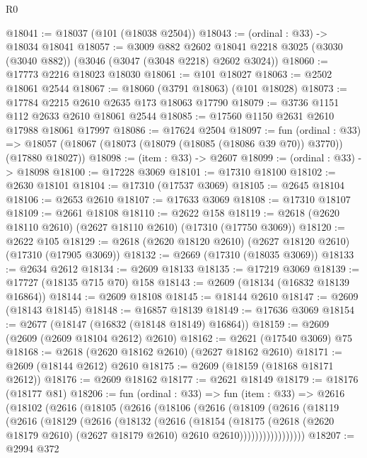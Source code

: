 \begin{lexlean}{R0}
\begin{coremodule}
@18041 := @18037 (@101 (@18038 @2504))
@18043 := (ordinal : @33) -> @18034 @18041
@18057 := @3009
    @882
    @2602
    @18041
    @2218
    @3025
    (@3030 (@3040 @882))
    (@3046 (@3047 (@3048 @2218) @2602 @3024))
@18060 := @17773 @2216 @18023 @18030
@18061 := @101 @18027
@18063 := @2502 @18061 @2544
@18067 := @18060 (@3791 @18063) (@101 @18028)
@18073 := @17784 @2215 @2610 @2635 @173 @18063 @17790
@18079 := @3736 @1151 @112 @2633 @2610 @18061 @2544
@18085 := @17560 @1150 @2631 @2610 @17988 @18061 @17997
@18086 := @17624 @2504
@18097 := fun (ordinal : @33) =>
  @18057 (@18067 (@18073 (@18079 (@18085 (@18086 @39 @70)) @3770)) (@17880 @18027))
@18098 := (item : @33) -> @2607
@18099 := (ordinal : @33) -> @18098
@18100 := @17228 @3069
@18101 := @17310 @18100
@18102 := @2630 @18101
@18104 := @17310 (@17537 @3069)
@18105 := @2645 @18104
@18106 := @2653 @2610
@18107 := @17633 @3069
@18108 := @17310 @18107
@18109 := @2661 @18108
@18110 := @2622 @158
@18119 := @2618 (@2620 @18110 @2610) (@2627 @18110 @2610) (@17310 (@17750 @3069))
@18120 := @2622 @105
@18129 := @2618 (@2620 @18120 @2610) (@2627 @18120 @2610) (@17310 (@17905 @3069))
@18132 := @2669 (@17310 (@18035 @3069))
@18133 := @2634 @2612
@18134 := @2609 @18133
@18135 := @17219 @3069
@18139 := @17727 (@18135 @715 @70) @158
@18143 := @2609 (@18134 (@16832 @18139 @16864))
@18144 := @2609 @18108
@18145 := @18144 @2610
@18147 := @2609 (@18143 @18145)
@18148 := @16857 @18139
@18149 := @17636 @3069
@18154 := @2677 (@18147 (@16832 (@18148 @18149) @16864))
@18159 := @2609 (@2609 (@2609 @18104 @2612) @2610)
@18162 := @2621 (@17540 @3069) @75
@18168 := @2618 (@2620 @18162 @2610) (@2627 @18162 @2610)
@18171 := @2609 (@18144 @2612) @2610
@18175 := @2609 (@18159 (@18168 @18171 @2612))
@18176 := @2609 @18162
@18177 := @2621 @18149
@18179 := @18176 (@18177 @81)
@18206 := fun (ordinal : @33) =>
  fun (item : @33) =>
  @2616
    (@18102
      (@2616
        (@18105
          (@2616
            (@18106
              (@2616
                (@18109
                  (@2616
                    (@18119
                      (@2616
                        (@18129
                          (@2616
                            (@18132
                              (@2616
                                (@18154
                                  (@18175
                                    (@2618
                                      (@2620 @18179 @2610)
                                      (@2627 @18179 @2610)
                                      @2610
                                      @2610)))))))))))))))))
@18207 := @2994 @372

\end{coremodule}
\end{lexlean}
